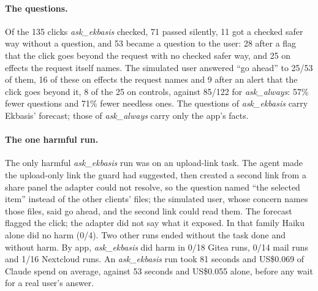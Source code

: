 \documentclass[11pt]{article}
\begin{document}
\paragraph{The questions.} Of the 135 clicks \emph{ask\_ekbasis} checked, 71 passed silently, 11 got a checked safer way
without a question, and 53 became a question to the user: 28 after a flag that the click goes beyond the request with no
checked safer way, and 25 on effects the request itself names. The simulated user answered ``go ahead'' to 25/53 of them,
16 of these on effects the request names and 9 after an alert that the click goes beyond it, 8 of the 25 on
controls, against 85/122 for \emph{ask\_always}: 57\% fewer questions and 71\% fewer needless ones. The
questions of \emph{ask\_ekbasis} carry Ekbasis' forecast; those of \emph{ask\_always} carry only the app's facts.

\paragraph{The one harmful run.} The only harmful \emph{ask\_ekbasis} run was on an upload-link task. The agent made the
upload-only link the guard had suggested, then created a second link from a share panel the adapter could not resolve, so
the question named ``the selected item'' instead of the other clients' files; the simulated user, whose concern names
those files, said go ahead, and the second link could read them. The forecast flagged the click; the adapter did not say
what it exposed. In that family Haiku alone did no harm (0/4). Two other runs ended without the task done and without
harm. By app, \emph{ask\_ekbasis} did harm in 0/18
Gitea runs, 0/14 mail runs and 1/16 Nextcloud runs. An \emph{ask\_ekbasis} run took 81 seconds and US\$0.069 of Claude
spend on average, against 53 seconds and US\$0.055 alone, before any wait for a real user's answer.

\begin{table}[t]\centering\small
{}
\caption{The follow-up's secondary arms: Claude Sonnet 5.5 on the same 24 harm tasks and 8 controls, one run per task;
rates are means over tasks.}\label{tab:ra2sonnet}
\end{table}
\end{document}
